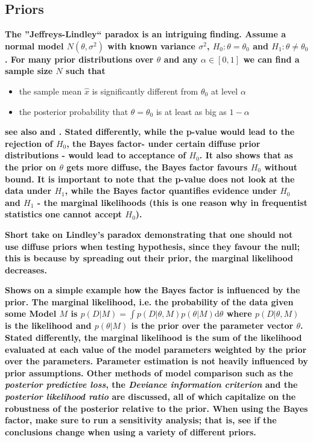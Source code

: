 \documentclass[12pt]{scrartcl}
\begin{document}
\subsection{Priors}
\begin{description}
  \item {}
  
  \textbf{The ''Jeffreys-Lindley`` paradox is an intriguing finding. Assume a normal model $N(\theta, \sigma^2)$ with known variance $\sigma^2$, $H_0: \theta = \theta_0$ and $H_1: \theta \neq \theta_0$. For many prior distributions over $\theta$ and any $\alpha \in [0, 1]$ we can find a sample size $N$ such that}
  
  \begin{itemize}
    \item the sample mean $\hat x$ is significantly different from $\theta_0$ at level $\alpha$
    \item the posterior probability that $\theta = \theta_0$ is at least as big as $1 - \alpha$
  \end{itemize}
  
  \textbf{see also \cite{sprenger2013testing} and \cite{robert2014jeffreys}. Stated differently, while the p-value would lead to the rejection of $H_0$, the Bayes factor- under certain diffuse prior distributions - would lead to acceptance of $H_0$. It also shows that as the prior on $\theta$ gets more diffuse, the Bayes factor favours $H_0$ without bound. It is important to note that the p-value does not look at the data under $H_1$, while the Bayes factor quantifies evidence under $H_0$ and $H_1$ - the marginal likelihoods (this is one reason why in frequentist statistics one cannot accept $H_0$).
  }
  
  \item {}
  
  \textbf{Short take on Lindley's paradox demonstrating that one should not use diffuse priors when testing hypothesis, since they favour the null; this is because by spreading out their prior, the marginal likelihood decreases.}
 
  \item {}
  
  \textbf{Shows on a simple example how the Bayes factor is influenced by the prior. The marginal likelihood, i.e. the probability of the data given some Model $M$ is $p(D|M) = \int p(D|\theta, M)p(\theta| M) \mathrm{d}\theta$ where $p(D|\theta, M)$ is the likelihood and $p(\theta|M)$ is the prior over the parameter vector $\theta$. Stated differently, the marginal likelihood is the sum of the likelihood evaluated at each value of the model parameters weighted by the prior over the parameters. Parameter estimation is not heavily influenced by prior assumptions. Other methods of model comparison such as the \emph{posterior predictive loss}, the \emph{Deviance information criterion} and the \emph{posterior likelihood ratio} are discussed, all of which capitalize on the robustness of the posterior relative to the prior. When using the Bayes factor, make sure to run a sensitivity analysis; that is, see if the conclusions change when using a variety of different priors.}
  

\end{description}
\end{document}

